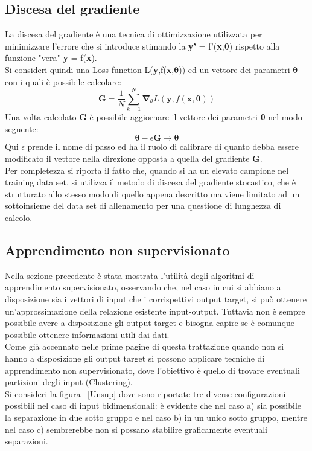 \subsection{Discesa del gradiente}
\label{discesa del gradiente}
La discesa del gradiente è una tecnica di ottimizzazione utilizzata per minimizzare l'errore che si introduce stimando la \textbf{y'} = f'(\textbf{x},$\bm{\theta}$) rispetto alla funzione "vera" \textbf{y} = f(\textbf{x}). \\
Si consideri quindi una Loss function L(\textbf{y},f(\textbf{x},$\bm{\theta}$)) ed un vettore dei parametri $\bm{\theta}$ con i quali è possibile calcolare: \\
\begin{equation}
\textbf{G} = \frac{1}{N} \sum_{k=1}^{N} \boldsymbol{\nabla}_\theta L(\textbf{y},f(\textbf{x},\bm{\theta})) 
\end{equation} 
Una volta calcolato \textbf{G} è possibile aggiornare il vettore dei parametri $\bm{\theta}$ nel modo seguente:
\begin{equation}
\bm{\theta} - \epsilon\textbf{G} \rightarrow \bm{\theta}
\end{equation}
Qui $\epsilon$ prende il nome di passo ed ha il ruolo di calibrare di quanto debba essere modificato il vettore \bm{$\theta$} nella direzione opposta a quella del gradiente \textbf{G}.\\
Per completezza si riporta il fatto che, quando si ha un elevato campione nel training data set, si utilizza il metodo di discesa del gradiente stocastico, che è strutturato allo stesso modo di quello appena descritto ma viene limitato ad un sottoinsieme del data set di allenamento per una questione di lunghezza di calcolo.
\newpage

\subsection{Apprendimento non supervisionato}
\label{app_non_sup}

Nella sezione precedente è stata mostrata l'utilità degli algoritmi di apprendimento supervisionato, osservando che, nel caso in cui si abbiano a disposizione sia i vettori di input che i corrispettivi output target, si può ottenere un'approssimazione della relazione esistente input-output.
Tuttavia non è sempre possibile avere a disposizione gli output target e bisogna capire se è comunque possibile ottenere informazioni utili dai dati. \\
Come già accennato nelle prime pagine di questa trattazione quando non si hanno a disposizione gli output target si possono applicare tecniche di apprendimento non supervisionato, dove l'obiettivo è quello di trovare eventuali partizioni degli input (Clustering). \\
Si consideri la figura ~\ref{Unsup} dove sono riportate tre diverse configurazioni possibili nel caso di input bidimensionali: è evidente che nel caso a) sia possibile la separazione in due sotto gruppo e nel caso b) in un unico sotto gruppo, mentre nel caso c) sembrerebbe non si possano stabilire graficamente eventuali separazioni.

